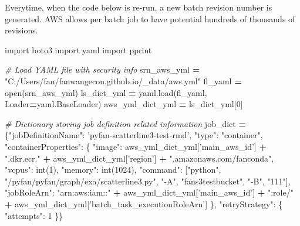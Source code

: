 \documentclass[
]{book}
\newenvironment{Shaded}{\begin{snugshade}}{\end{snugshade}}
\newcommand{\BuiltInTok}[1]{#1}
\newcommand{\CommentTok}[1]{\textcolor[rgb]{0.56,0.35,0.01}{\textit{#1}}}
\newcommand{\DecValTok}[1]{\textcolor[rgb]{0.00,0.00,0.81}{#1}}
\newcommand{\ImportTok}[1]{#1}
\newcommand{\NormalTok}[1]{#1}
\newcommand{\OperatorTok}[1]{\textcolor[rgb]{0.81,0.36,0.00}{\textbf{#1}}}
\newcommand{\StringTok}[1]{\textcolor[rgb]{0.31,0.60,0.02}{#1}}
\begin{document}
Everytime, when the code below is re-run, a new batch revision number is generated. AWS allows per batch job to have potential hundreds of thousands of revisions.

\begin{Shaded}
\begin{Highlighting}[]
\ImportTok{import}\NormalTok{ boto3}
\ImportTok{import}\NormalTok{ yaml}
\ImportTok{import}\NormalTok{ pprint}

\CommentTok{# Load YAML file with security info}
\NormalTok{srn_aws_yml }\OperatorTok{=} \StringTok{"C:/Users/fan/fanwangecon.github.io/_data/aws.yml"}
\NormalTok{fl_yaml }\OperatorTok{=} \BuiltInTok{open}\NormalTok{(srn_aws_yml)}
\NormalTok{ls_dict_yml }\OperatorTok{=}\NormalTok{ yaml.load(fl_yaml, Loader}\OperatorTok{=}\NormalTok{yaml.BaseLoader)}
\NormalTok{aws_yml_dict_yml }\OperatorTok{=}\NormalTok{ ls_dict_yml[}\DecValTok{0}\NormalTok{]}

\CommentTok{# Dictionary storing job definition related information}
\NormalTok{job_dict }\OperatorTok{=}\NormalTok{ \{}\StringTok{"jobDefinitionName"}\NormalTok{: }\StringTok{'pyfan-scatterline3-test-rmd'}\NormalTok{,}
            \StringTok{"type"}\NormalTok{: }\StringTok{"container"}\NormalTok{,}
            \StringTok{"containerProperties"}\NormalTok{: \{}
                \StringTok{"image"}\NormalTok{: aws_yml_dict_yml[}\StringTok{'main_aws_id'}\NormalTok{] }\OperatorTok{+} \StringTok{".dkr.ecr."} \OperatorTok{+}
\NormalTok{                         aws_yml_dict_yml[}\StringTok{'region'}\NormalTok{] }\OperatorTok{+} \StringTok{".amazonaws.com/fanconda"}\NormalTok{,}
                \StringTok{"vcpus"}\NormalTok{: }\BuiltInTok{int}\NormalTok{(}\DecValTok{1}\NormalTok{),}
                \StringTok{"memory"}\NormalTok{: }\BuiltInTok{int}\NormalTok{(}\DecValTok{1024}\NormalTok{),}
                \StringTok{"command"}\NormalTok{: [}\StringTok{"python"}\NormalTok{,}
                            \StringTok{"/pyfan/pyfan/graph/exa/scatterline3.py"}\NormalTok{,}
                            \StringTok{"-A"}\NormalTok{, }\StringTok{"fans3testbucket"}\NormalTok{,}
                            \StringTok{"-B"}\NormalTok{, }\StringTok{"111"}\NormalTok{],}
                \StringTok{"jobRoleArn"}\NormalTok{: }\StringTok{"arn:aws:iam::"} \OperatorTok{+}\NormalTok{ aws_yml_dict_yml[}\StringTok{'main_aws_id'}\NormalTok{] }\OperatorTok{+}
                              \StringTok{":role/"} \OperatorTok{+}\NormalTok{ aws_yml_dict_yml[}\StringTok{'batch_task_executionRoleArn'}\NormalTok{]}
\NormalTok{            \},}
            \StringTok{"retryStrategy"}\NormalTok{: \{}
                \StringTok{"attempts"}\NormalTok{: }\DecValTok{1}
\NormalTok{            \}\}}


\end{Highlighting}
\end{Shaded}
\end{document}
